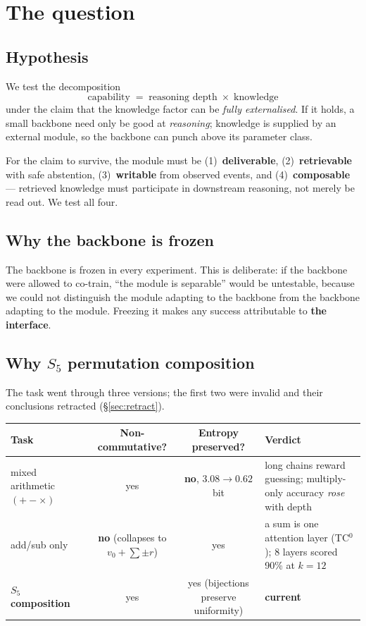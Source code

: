 \documentclass[11pt, a4paper]{article}
\begin{document}
\tableofcontents
\newpage

\section{The question}

\subsection{Hypothesis}

We test the decomposition
\[
\text{capability} \;=\; \text{reasoning depth} \;\times\; \text{knowledge}
\]
under the claim that the knowledge factor can be \emph{fully externalised}. If it holds,
a small backbone need only be good at \emph{reasoning}; knowledge is supplied by an
external module, so the backbone can punch above its parameter class.

For the claim to survive, the module must be (1)~\textbf{deliverable}, (2)~\textbf{retrievable}
with safe abstention, (3)~\textbf{writable} from observed events, and
(4)~\textbf{composable} --- retrieved knowledge must participate in downstream reasoning,
not merely be read out. We test all four.

\subsection{Why the backbone is frozen}

The backbone is frozen in every experiment. This is deliberate: if the backbone were
allowed to co-train, ``the module is separable'' would be untestable, because we could
not distinguish the module adapting to the backbone from the backbone adapting to the
module. Freezing it makes any success attributable to \textbf{the interface}.

\subsection{Why $S_5$ permutation composition}

The task went through three versions; the first two were invalid and their conclusions
retracted (\S\ref{sec:retract}).

\begin{table}[h]
\centering\small
\begin{tabular}{lccp{7.4cm}}
\toprule
Task & Non-commutative? & Entropy preserved? & Verdict \\
\midrule
mixed arithmetic $(+-\times)$ & yes & \textbf{no}, $3.08 \to 0.62$ bit
  & long chains reward guessing; multiply-only accuracy \emph{rose} with depth \\
add/sub only & \textbf{no} (collapses to $v_0 + \sum \pm r$) & yes
  & a sum is one attention layer (TC$^0$); 8 layers scored 90\% at $k{=}12$ \\
\textbf{$S_5$ composition} & yes & yes (bijections preserve uniformity) & \textbf{current} \\
\bottomrule
\end{tabular}
\end{table}
\end{document}
